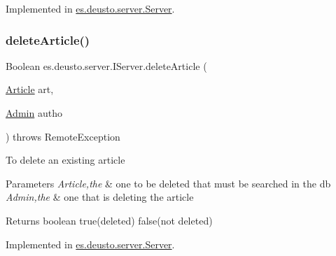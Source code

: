 Implemented in \hyperlink{classes_1_1deusto_1_1server_1_1_server_a58363d9c2c5c5d1e085e22deeeebf833}{es.\+deusto.\+server.\+Server}.

\mbox{\label{interfacees_1_1deusto_1_1server_1_1_i_server_ac96e072eb8a660ebcd5e535cb1324e64}} 
\subsubsection{\texorpdfstring{delete\+Article()}{deleteArticle()}}
{\footnotesize\ttfamily Boolean es.\+deusto.\+server.\+I\+Server.\+delete\+Article (\begin{DoxyParamCaption}\item[{\hyperlink{classes_1_1deusto_1_1server_1_1jdo_1_1_article}{Article}}]{art,  }\item[{\hyperlink{classes_1_1deusto_1_1server_1_1jdo_1_1_admin}{Admin}}]{autho }\end{DoxyParamCaption}) throws Remote\+Exception}

To delete an existing article


\begin{DoxyParams}{Parameters}
{\em Article,the} & one to be deleted that must be searched in the db \\
\hline
{\em Admin,the} & one that is deleting the article \\
\hline
\end{DoxyParams}
\begin{DoxyReturn}{Returns}
boolean true(deleted) false(not deleted) 
\end{DoxyReturn}


Implemented in \hyperlink{classes_1_1deusto_1_1server_1_1_server_ad9d8810833b631866924dc481801614a}{es.\+deusto.\+server.\+Server}.

\mbox{\label{interfacees_1_1deusto_1_1server_1_1_i_server_ab5c4258f62146d90a064604891cedf2f}} 
